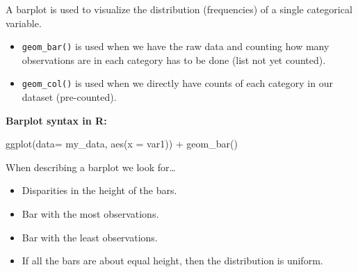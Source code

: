\documentclass[
  letterpaper,
  DIV=11,
  numbers=noendperiod]{scrreprt}
\newenvironment{Shaded}{\begin{snugshade}}{\end{snugshade}}
\newcommand{\AttributeTok}[1]{\textcolor[rgb]{0.40,0.45,0.13}{#1}}
\newcommand{\FunctionTok}[1]{\textcolor[rgb]{0.28,0.35,0.67}{#1}}
\newcommand{\NormalTok}[1]{\textcolor[rgb]{0.00,0.23,0.31}{#1}}
\newcommand{\SpecialCharTok}[1]{\textcolor[rgb]{0.37,0.37,0.37}{#1}}
\providecommand{\tightlist}{%
  \setlength{\itemsep}{0pt}\setlength{\parskip}{0pt}}\usepackage{longtable,booktabs,array}
\begin{document}
\begin{tcolorbox}[enhanced jigsaw, breakable, colback=white, bottomrule=.15mm, leftrule=.75mm, colframe=quarto-callout-note-color-frame, arc=.35mm, rightrule=.15mm, toprule=.15mm, left=2mm, opacityback=0]

A barplot is used to visualize the distribution (frequencies) of a
single categorical variable.

\begin{itemize}
\item
  \texttt{geom\_bar()} is used when we have the raw data and counting
  how many observations are in each category has to be done (list not
  yet counted).
\item
  \texttt{geom\_col()} is used when we directly have counts of each
  category in our dataset (pre-counted).
\end{itemize}

\textbf{Barplot syntax in R:}

\begin{Shaded}
\begin{Highlighting}[]
\FunctionTok{ggplot}\NormalTok{(}\AttributeTok{data=}\NormalTok{ my\_data, }\FunctionTok{aes}\NormalTok{(}\AttributeTok{x =}\NormalTok{ var1)) }\SpecialCharTok{+}
  \FunctionTok{geom\_bar}\NormalTok{()}
\end{Highlighting}
\end{Shaded}

\end{tcolorbox}

\begin{tcolorbox}[enhanced jigsaw, breakable, colback=white, bottomrule=.15mm, leftrule=.75mm, colframe=quarto-callout-note-color-frame, arc=.35mm, rightrule=.15mm, toprule=.15mm, left=2mm, opacityback=0]

When describing a barplot we look for\ldots{}

\begin{itemize}
\tightlist
\item
  Disparities in the height of the bars.
\item
  Bar with the most observations.
\item
  Bar with the least observations.
\item
  If all the bars are about equal height, then the distribution is
  uniform.
\end{itemize}

\end{tcolorbox}
\end{document}
